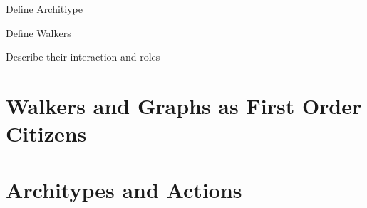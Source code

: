 
Define Architiype

Define Walkers

Describe their interaction and roles


\section{Walkers and Graphs as First Order Citizens}
\section{Architypes and Actions}